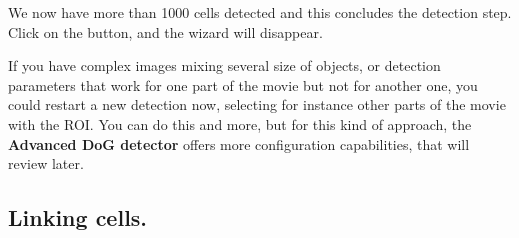 We now have more than 1000 cells detected and this concludes the detection step.
Click on the  button, and the wizard will disappear.

If you have complex images mixing several size of objects, or detection parameters that work for one part of the movie but not for another one, you could restart a new detection now, selecting for instance other parts of the movie with the ROI.
You can do this and more, but for this kind of approach, the \textbf{Advanced DoG detector} offers more configuration capabilities, that will review later.



\subsection{Linking cells.}